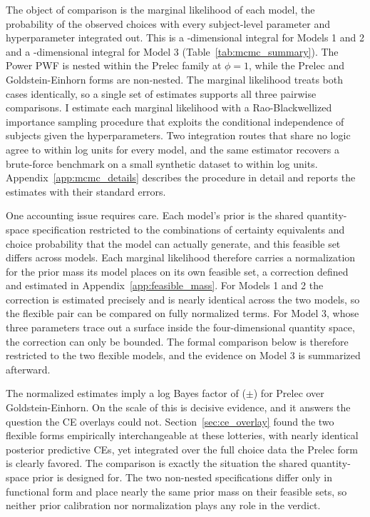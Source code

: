 \documentclass[12pt,a4paper]{article}
\theoremstyle{definition}
\theoremstyle{remark}
\begin{document}
The object of comparison is the marginal likelihood of each model, the
probability of the observed choices with every subject-level parameter
and hyperparameter integrated out. This is a
-dimensional integral for Models 1 and 2 and a
-dimensional integral for Model 3
(Table~\ref{tab:mcmc_summary}). The Power PWF is nested within the
Prelec family at $\phi = 1$, while the Prelec and Goldstein-Einhorn
forms are non-nested. The marginal likelihood treats both cases
identically, so a single set of estimates supports all three pairwise
comparisons. I estimate each marginal likelihood with a
Rao-Blackwellized importance sampling procedure that exploits the
conditional independence of subjects given the hyperparameters. Two
integration routes that share no logic agree to within
 log units for every model, and the
same estimator recovers a brute-force benchmark on a small synthetic
dataset to within  log units.
Appendix~\ref{app:mcmc_details} describes the procedure in detail and
reports the estimates with their standard errors.

One accounting issue requires care. Each model's prior is the shared
quantity-space specification restricted to the combinations of
certainty equivalents and choice probability that the model can
actually generate, and this feasible set differs across models. Each
marginal likelihood therefore carries a normalization for the prior
mass its model places on its own feasible set, a correction defined
and estimated in Appendix~\ref{app:feasible_mass}. For Models 1 and 2
the correction is estimated precisely and is nearly identical across
the two models, so the flexible pair can be compared on fully
normalized terms. For Model 3, whose three parameters trace out a
surface inside the four-dimensional quantity space, the correction can
only be bounded. The formal comparison below is therefore restricted
to the two flexible models, and the evidence on Model 3 is summarized
afterward.

The normalized estimates imply a log Bayes factor of
($\pm$) for Prelec over
Goldstein-Einhorn. On the scale of \textcite{KassRaftery1995} this is
decisive evidence, and it answers the question the CE overlays could
not. Section~\ref{sec:ce_overlay} found the two flexible forms
empirically interchangeable at these lotteries, with nearly identical
posterior predictive CEs, yet integrated over the full choice data the
Prelec form is clearly favored. The comparison is exactly the situation
the shared quantity-space prior is designed for. The two non-nested
specifications differ only in functional form and place nearly the same
prior mass on their feasible sets, so neither prior calibration nor
normalization plays any role in the verdict.
\end{document}
